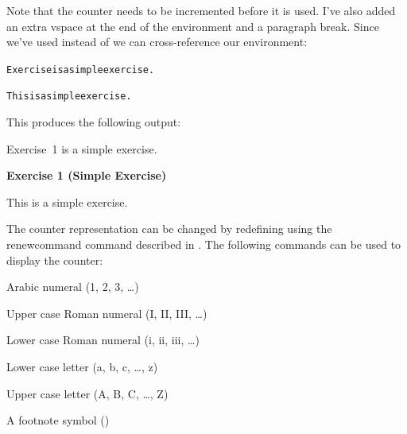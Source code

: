 Note that the counter needs to be incremented before it is used.  
I've also added an extra \gls{vspace} at the end of the
environment and a paragraph break.
Since we've used  instead of 
 we can cross-reference our
 environment:\reportpagebreak
\begin{code}
\begin{alltt}
Exercise is a simple exercise.

This is a simple exercise.
\end{alltt}
\end{code}%
This produces 
the following output:
\begin{result}
Exercise~1 is a simple exercise.
\par\vspace{\baselineskip}\noindent\textbf{Exercise 1 (Simple Exercise)}%
\begin{itshape}\par\vspace{\baselineskip}\noindent
This is a simple exercise.
\end{itshape}
\end{result}

The counter representation can be changed by redefining
 using the \gls{renewcommand}
command described in .
The following commands can be used to display the counter:

\begin{fwlist}{}
 Arabic numeral (1, 2, 3, \ldots)

 Upper case Roman numeral 
(I, II, III, \ldots)

 Lower case Roman numeral 
(i, ii, iii, \ldots)

 Lower case letter 
(a, b, c, \ldots, z)

 Upper case letter 
(A, B, C, \ldots, Z)

A footnote symbol 
()
\end{fwlist}

